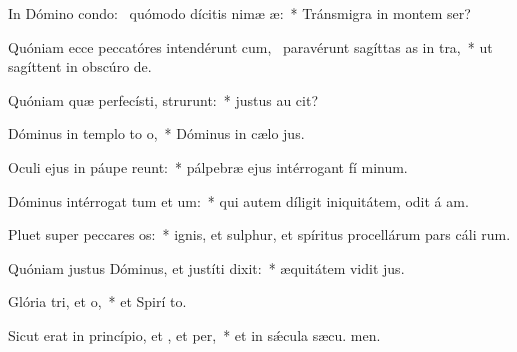 \item In Dómino condo:~\pscross{} quómodo dícitis nimæ æ:~* Tránsmigra in montem  ser?
\item Quóniam ecce peccatóres intendérunt cum,~\pscross{} paravérunt sagíttas as in tra,~* ut sagíttent in obscúro  de.
\item Quóniam quæ perfecísti, strurunt:~* justus au  cit?
\item Dóminus in templo to o,~* Dóminus in cælo  jus.
\item Oculi ejus in páupe reunt:~* pálpebræ ejus intérrogant fí minum.
\item Dóminus intérrogat tum et um:~* qui autem díligit iniquitátem, odit á am.
\item Pluet super peccares os:~* ignis, et sulphur, et spíritus procellárum pars cáli rum.
\item Quóniam justus Dóminus, et justíti dixit:~* æquitátem vidit  jus.
\item Glória tri, et o,~* et Spirí to.
\item Sicut erat in princípio, et , et per,~* et in sǽcula sæcu. men.
